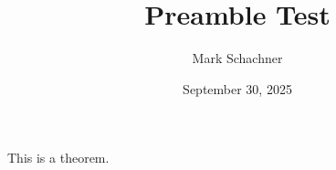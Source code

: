 \documentclass[psamsfonts]{amsart}
\title{Preamble Test}
\author{Mark Schachner}
\date{September 30, 2025}
\begin{document}
\maketitle

\begin{theorem}
    This is a theorem.
\end{theorem}
\end{document}
